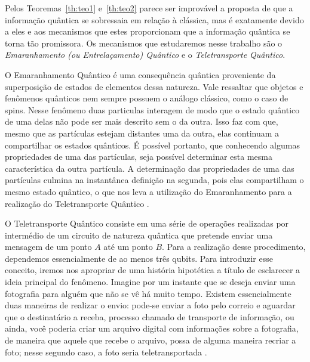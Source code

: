 \documentclass[12pt,oneside,brazil,hidelinks,article,sumario=tradicional,a4paper]{abntex2}
\begin{document}
Pelos Teoremas~\ref{th:teo1} e~\ref{th:teo2} parece ser improvável a proposta de que a informação quântica se sobressaia em relação à clássica, mas é exatamente devido a eles e aos mecanismos que estes proporcionam que a informação quântica se torna tão promissora. Os mecanismos que estudaremos nesse trabalho são o \textit{Emaranhamento (ou Entrelaçamento) Quântico} e o \textit{Teletransporte Quântico}.

O Emaranhamento Quântico é uma consequência quântica proveniente da superposição de estados de elementos dessa natureza. Vale ressaltar que objetos e fenômenos quânticos nem sempre possuem o análogo clássico, como o caso de spins. Nesse fenômeno duas particulas interagem de modo que o estado quântico de uma delas não pode ser mais descrito sem o da outra. Isso faz com que, mesmo que as partículas estejam distantes uma da outra, elas continuam a compartilhar os estados quânticos. É possível portanto, que conhecendo algumas propriedades de uma das partículas, seja possível determinar esta mesma característica da outra partícula. A determinação das propriedades de uma das partículas culmina na instantânea definição na segunda, pois elas compartilham o mesmo estado quântico, o que nos leva a utilização do Emaranhamento para a realização do Teletransporte Quântico \cites{materialdidaticomecquantica}{fonzar}{TeoQuanInfoEntreCopia}.

O Teletransporte Quântico consiste em uma série de operações realizadas por intermédio de um circuito de natureza quântica que pretende enviar uma mensagem de um ponto \(A\) até um ponto \(B\). Para a realização desse procedimento, dependemos essencialmente de ao menos três qubits. Para introduzir esse conceito, iremos nos apropriar de uma história hipotética a título de esclarecer a ideia principal do fenômeno. Imagine por um instante que se deseja enviar uma fotografia para alguém que não se vê há muito tempo. Existem essencialmente duas maneiras de realizar o envio: pode-se enviar a foto pelo correio e aguardar que o destinatário a receba, processo chamado de transporte de informação, ou ainda, você poderia criar um arquivo digital com informações sobre a fotografia, de maneira que aquele que recebe o arquivo, possa de alguma maneira recriar a foto; nesse segundo caso, a foto seria teletransportada \cite{materialdidaticomecquantica}.
\end{document}
